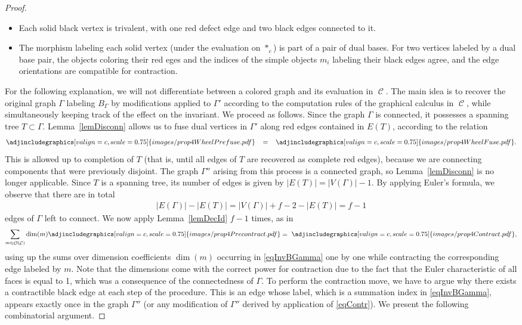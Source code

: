 \documentclass[pdftex]{sigma}
\DeclareMathOperator{\calc}{\mathcal{C}}
\DeclareMathOperator{\calo}{\mathcal{O}}
\numberwithin{equation}{section}
\theoremstyle{definition}
\begin{document}
\begin{proof}
 \begin{itemize}\itemsep=0pt
 \item Each solid black vertex is trivalent, with one red defect edge and two black edges connected to it.
 \item The morphism labeling each solid vertex (under the evaluation on $*_c$) is part of a pair of dual bases. For two vertices labeled by a dual base pair, the objects coloring their red eges and the indices of the simple objects $m_i$ labeling their black edges agree, and the edge orientations are compatible for contraction.
 \end{itemize}
 For the following explanation, we will not differentiate between a colored graph and its evaluation in $\calc$. The main idea is to recover the original graph $\Gamma$ labeling $B_{\Gamma}$ by modifications applied to $\Gamma'$ according to the computation rules of the graphical calculus in $\calc$, while simultaneously keeping track of the effect on the invariant. We proceed as follows. Since the graph $\Gamma$ is connected, it possesses a spanning tree $T \subset \Gamma$. Lemma~\ref{lemDisconn} allows us to fuse dual vertices in $\Gamma'$ along red edges contained in $E(T)$, according to the relation
 \begin{align*}
 \adjincludegraphics[valign=c, scale = 0.75]{images/prop4WheelPrefuse.pdf} \, \, \, \, \, = \, \, \, \, \,\adjincludegraphics[valign=c, scale = 0.75]{images/prop4WheelFuse.pdf}.
 \end{align*}
 This is allowed up to completion of $T$ (that is, until all edges of $T$ are recovered as complete red edges), because we are connecting components that were previously disjoint. The graph $\Gamma''$ arising from this process is a connected graph, so Lemma~\ref{lemDisconn} is no longer applicable. Since $T$ is a spanning tree, its number of edges is given by $|E(T)| = |V(\Gamma)| -1$. By applying Euler's formula, we observe that there are in total
 \begin{align}
 \label{eqCount}
 |E(\Gamma)|- |E(T)| = |V(\Gamma)| + f - 2 - |E(T)| = f-1
 \end{align}
 edges of $\Gamma$ left to connect. We now apply Lemma~\ref{lemDecId} $f-1$ times, as in
 \begin{align}
 \label{eqContr}
 \sum_{m \in \calo(\calc)} \dim(m) \adjincludegraphics[valign=c, scale = 0.75]{images/prop4Precontract.pdf} = \, \, \adjincludegraphics[valign=c, scale = 0.75]{images/prop4Contract.pdf},
 \end{align}
 using up the sums over dimension coefficients $\dim(m)$ occurring in \eqref{eqInvBGamma} one by one while contracting the corresponding edge labeled by $m$. Note that the dimensions come with the correct power for contraction due to the fact that the Euler characteristic of all faces is equal to 1, which was a consequence of the connectedness of $\Gamma$. To perform the contraction move, we have to argue why there exists a contractible black edge at each step of the procedure. This is an edge whose label, which is a summation index in \eqref{eqInvBGamma}, appears exactly once in the graph $\Gamma''$ (or any modification of $\Gamma''$ derived by application of \eqref{eqContr}). We present the following combinatorial argument.

\end{proof}
\end{document}
